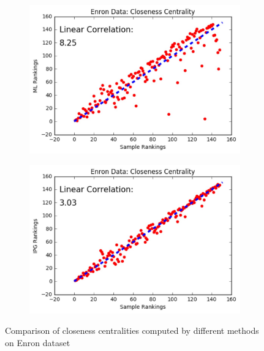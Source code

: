 \documentclass[10pt]{beamer}
\begin{document}
\begin{frame}
\begin{figure}[H]
\begin{subfigure}{.32\textwidth}
    \includegraphics[width=0.95\linewidth]{ECC_ML.jpeg}
\end{subfigure}
\begin{subfigure}{.32\textwidth}
	\centering
    \includegraphics[width=0.95\linewidth]{ECC_IPG.jpeg}
\end{subfigure}
\caption{Comparison of closeness centralities computed by different methods on Enron dataset}
\end{figure}
\end{frame}
\end{document}
